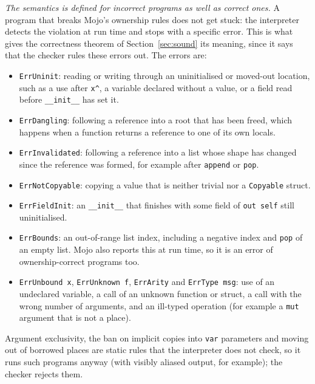 \documentclass[11pt,a4paper]{article}
\newcommand{\code}[1]{\texttt{#1}}
\begin{document}
\emph{The semantics is defined for incorrect programs as well as correct ones.}
A program that breaks Mojo's ownership rules does not get stuck: the interpreter
detects the violation at run time and stops with a specific error. This is what
gives the correctness theorem of Section~\ref{sec:sound} its meaning, since it
says that the checker rules these errors out. The errors are:
\begin{itemize}
\item \code{ErrUninit}: reading or writing through an uninitialised or moved-out
  location, such as a use after \code{x\^{}}, a variable declared without a value, or
  a field read before \code{\_\_init\_\_} has set it.
\item \code{ErrDangling}: following a reference into a root that has been freed,
  which happens when a function returns a reference to one of its own locals.
\item \code{ErrInvalidated}: following a reference into a list whose shape has
  changed since the reference was formed, for example after \code{append} or
  \code{pop}.
\item \code{ErrNotCopyable}: copying a value that is neither trivial nor a
  \code{Copyable} struct.
\item \code{ErrFieldInit}: an \code{\_\_init\_\_} that finishes with some field of
  \code{out self} still uninitialised.
\item \code{ErrBounds}: an out-of-range list index, including a negative index and
  \code{pop} of an empty list. Mojo also reports this at run time, so it is an
  error of ownership-correct programs too.
\item \code{ErrUnbound x}, \code{ErrUnknown f}, \code{ErrArity} and
  \code{ErrType msg}: use of an undeclared variable, a call of an unknown function
  or struct, a call with the wrong number of arguments, and an ill-typed operation
  (for example a \code{mut} argument that is not a place).
\end{itemize}
Argument exclusivity, the ban on implicit copies into \code{var} parameters and
moving out of borrowed places are static rules that the interpreter does not
check, so it runs such programs anyway (with visibly aliased output, for
example); the checker rejects them.
\end{document}
